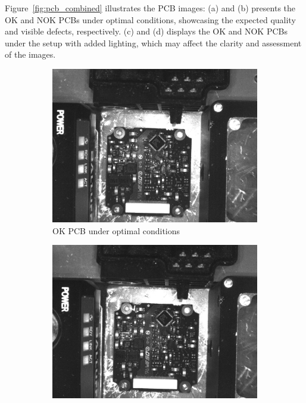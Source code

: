 \documentclass[12pt,DIV14,BCOR12mm,a4paper,footinclude=false,headinclude,parskip=half-,twoside,openright,cleardoublepage=empty,toc=index,bibliography=totoc,listof=totoc]{scrreprt}
\numberwithin{equation}{chapter}
\begin{document}
Figure~\ref{fig:pcb_combined} illustrates the PCB images: (a) and (b) presents the OK and NOK PCBs under optimal conditions, showcasing the expected quality and visible defects, respectively. (c) and (d) displays the OK and NOK PCBs under the setup with added lighting, which may affect the clarity and assessment of the images.
\begin{figure}
    \centering
    \begin{subfigure}[b]{0.45\textwidth}
        \centering
        \includegraphics[scale=0.15]{../media/PCB-optimal-OK.png}
        \caption{OK PCB under optimal conditions}
        \label{fig:pcb_optimal_ok}
    \end{subfigure}
    \hfill
    \begin{subfigure}[b]{0.45\textwidth}
        \centering
        \includegraphics[scale=0.15]{../media/PCB-optimal-NOK.png}

\end{subfigure}
\end{figure}
\end{document}
